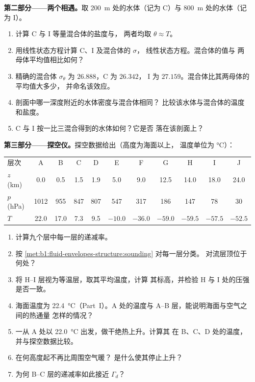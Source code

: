 \begin{problem}
\medskip
\noindent\textbf{第二部分——两个相遇。}取
\qty{200}{m} 处的水体（记为 C）与 \qty{800}{m} 处的水体（记为 I）。
\begin{enumerate}[resume]
  \item 计算 C 与 I 等量混合体的盐度与，
        两者均取 $\theta \approx T$。
  \item 用线性状态方程计算 C、I 及混合体的 $\sigma$，
        线性状态方程。混合体的值与
        两母体平均值相比如何？
  \item 精确的混合体 $\sigma_\theta$ 为 $26.888$，C 为 $26.342$，
        I 为 $27.159$。混合体比其两母体的平均值大多少，
        并命名该效应。
  \item 剖面中哪一深度附近的水体密度与混合体相同？
        比较该水体与混合体的温度和盐度。
  \item C 与 I 按一比三混合得到的水体如何？它是否
        落在该剖面上？
\end{enumerate}

\medskip
\noindent\textbf{第三部分——探空仪。}探空数据给出（高度为海面以上，
温度单位为 \si{\celsius}）：
\begin{center}
\small
\setlength{\tabcolsep}{4pt}
\begin{tabular}{|l|cccccccccc|}
\hline
层次 & A & B & C & D & E & F & G & H & I & J \\
$z$ (km) & 0.0 & 0.5 & 1.5 & 1.9 & 5.0 & 9.0 & 12.5 & 14.0 & 18.0 & 24.0 \\
$p$ (hPa) & 1012 & 955 & 847 & 807 & 547 & 317 & 186 & 147 & 78 & 30 \\
$T$ & 22.0 & 17.0 & 7.3 & 9.5 & $-10.0$ & $-36.0$ & $-59.0$ & $-59.5$ & $-57.5$ & $-52.5$ \\
\hline
\end{tabular}
\end{center}
\begin{enumerate}[resume]
  \item 计算九个层中每一层的递减率。
  \item 按 \cref{met:b1:fluid-envelopes-structure:sounding} 对每一层分类。
        对流层顶位于何处？
  \item 将 H--I 层视为等温层，取其平均温度，计算
        其标高，并检验 H 与 I 处的压强是否一致。
  \item 海面温度为 \qty{22.4}{\celsius}（Part~I）。A 处的温度与
        A--B 层，能说明海面与空气之间的热通量
        怎样的情况？
  \item 一从 A 处以 \qty{22.0}{\celsius} 出发，做干绝热上升。计算其
        在 B、C、D 处的温度，并与探空数据比较。
  \item {}在何高度起不再比周围空气暖？
        是什么使其停止上升？
  \item 为何 B--C 层的递减率如此接近 $\Gamma_d$？
\end{enumerate}


\end{problem}
